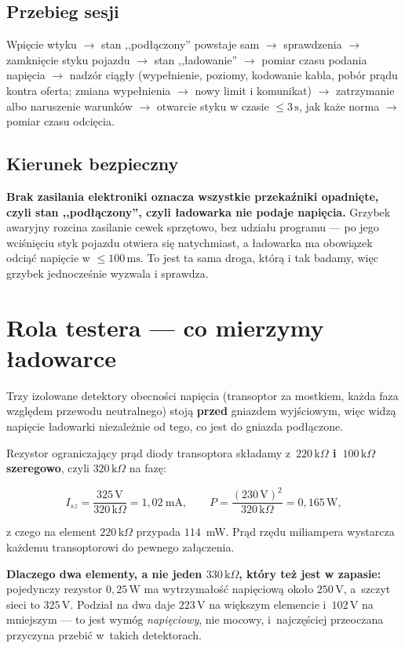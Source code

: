 \documentclass[a4paper,11pt]{article}
\newcommand{\kohm}{\,\mathrm{k}\Omega}
\newcommand{\volt}{\,\mathrm{V}}
\newcommand{\watt}{\,\mathrm{W}}
\newcommand{\ms}{\,\mathrm{ms}}
\newcommand{\sek}{\,\mathrm{s}}
\begin{document}
\subsection{Przebieg sesji}

Wpięcie wtyku $\rightarrow$ stan ,,podłączony'' powstaje sam $\rightarrow$
sprawdzenia $\rightarrow$ zamknięcie styku pojazdu $\rightarrow$ stan ,,ładowanie''
$\rightarrow$ pomiar czasu podania napięcia $\rightarrow$ nadzór ciągły
(wypełnienie, poziomy, kodowanie kabla, pobór prądu kontra oferta; zmiana
wypełnienia $\rightarrow$ nowy limit i komunikat) $\rightarrow$ zatrzymanie albo
naruszenie warunków $\rightarrow$ otwarcie styku w czasie $\le 3\sek$, jak każe
norma $\rightarrow$ pomiar czasu odcięcia.

\subsection{Kierunek bezpieczny}

\textbf{Brak zasilania elektroniki oznacza wszystkie przekaźniki opadnięte, czyli
stan ,,podłączony'', czyli ładowarka nie podaje napięcia.} Grzybek awaryjny
rozcina zasilanie cewek sprzętowo, bez udziału programu --- po jego wciśnięciu
styk pojazdu otwiera się natychmiast, a ładowarka ma obowiązek odciąć napięcie
w $\le100\ms$. To jest ta sama droga, którą i tak badamy, więc grzybek jednocześnie
wyzwala i sprawdza.

\section{Rola testera --- co mierzymy ładowarce}
\label{sec:tester}

Trzy izolowane detektory obecności napięcia (transoptor za mostkiem, każda faza
względem przewodu neutralnego) stoją \textbf{przed} gniazdem wyjściowym, więc widzą
napięcie ładowarki niezależnie od tego, co jest do gniazda podłączone.

Rezystor ograniczający prąd diody transoptora składamy z~\textbf{$220\kohm$
i~$100\kohm$ szeregowo}, czyli $320\kohm$ na fazę:

\[
I_{sz}=\frac{325\volt}{320\kohm}=1{,}02\ \mathrm{mA},
\qquad
P=\frac{(230\volt)^2}{320\kohm}=0{,}165\watt,
\]

z czego na element $220\kohm$ przypada $114$~mW. Prąd rzędu miliampera wystarcza
każdemu transoptorowi do pewnego załączenia.

\textbf{Dlaczego dwa elementy, a nie jeden $330\kohm$, który też jest w zapasie:}
pojedynczy rezystor $0{,}25\watt$ ma wytrzymałość napięciową około $250\volt$,
a~szczyt sieci to $325\volt$. Podział na dwa daje $223\volt$ na większym elemencie
i~$102\volt$ na mniejszym --- to jest wymóg \emph{napięciowy}, nie mocowy,
i~najczęściej przeoczana przyczyna przebić w~takich detektorach.
\end{document}
